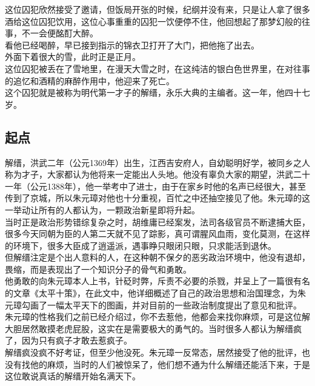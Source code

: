 \begin{multicols}{\theparacolNo}
这位囚犯欣然接受了邀请，但饭局开张的时候，纪纲并没有来，只是让人拿了很多酒给这位囚犯饮用，这位心事重重的囚犯一饮便停不住，他回想起了那梦幻般的往事，不一会便酩酊大醉。\\

看他已经喝醉，早已接到指示的锦衣卫打开了大门，把他拖了出去。\\

外面下着很大的雪，此时正是正月。\\

这位囚犯被丢在了雪地里，在漫天大雪之时，在这纯洁的银白色世界里，在对往事的追忆和酒精的麻醉作用中，他迎来了死亡。\\

这个囚犯就是被称为明代第一才子的解缙，永乐大典的主编者。这一年，他四十七岁。\\

\subsection{起点}
解缙，洪武二年（公元1369年）出生，江西吉安府人，自幼聪明好学，被同乡之人称为才子，大家都认为他将来一定能出人头地。他没有辜负大家的期望，洪武二十一年（公元1388年），他一举考中了进士，由于在家乡时他的名声已经很大，甚至传到了京城，所以朱元璋对他也十分重视，百忙之中还抽空接见了他。朱元璋的这一举动让所有的人都认为，一颗政治新星即将升起。\\

当时正是政治形势错综复杂之时，胡维庸已经案发，法司各级官员不断逮捕大臣，很多今天同朝为臣的人第二天就不见了踪影，真可谓腥风血雨，变化莫测，在这样的环境下，很多大臣成了逍遥派，遇事睁只眼闭只眼，只求能活到退休。\\

但解缙注定是个出人意料的人，在这种朝不保夕的恶劣政治环境中，他没有退却，畏缩，而是表现出了一个知识分子的骨气和勇敢。\\

他勇敢的向朱元璋本人上书，针砭时弊，斥责不必要的杀戮，并呈上了一篇很有名的文章《太平十策》，在此文中，他详细概述了自己的政治思想和治国理念，为朱元璋勾画了一幅太平天下的图画，并对目前的一些政治制度提出了意见和批评。\\

朱元璋的性格我们之前已经介绍过，你不去惹他，他都会来找你麻烦，可是这位解大胆居然敢摸老虎屁股，这实在是需要极大的勇气的。当时很多人都认为解缙疯了，因为只有疯子才敢去惹疯子。\\

解缙疯没疯不好考证，但至少他没死。朱元璋一反常态，居然接受了他的批评，也没有找他的麻烦，当时的人们被惊呆了，他们想不通为什么解缙还能活下来，于是这位敢说真话的解缙开始名满天下。\\


\end{multicols}
